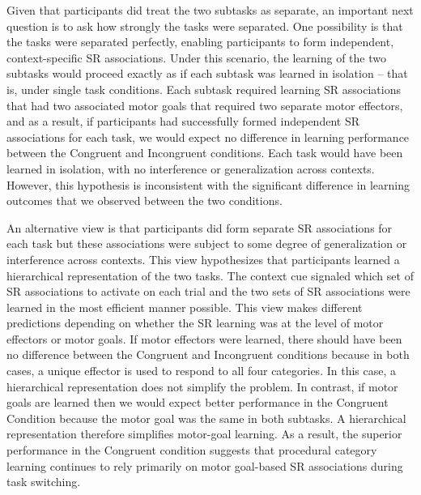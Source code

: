 \documentclass[doc, floatsintext]{apa7}
\begin{document}
Given that participants did treat the two subtasks as separate, an important next question is to ask how strongly the tasks were separated. One possibility is that the tasks were separated perfectly, enabling participants to form independent, context-specific SR associations. Under this scenario, the learning of the two subtasks would proceed exactly as if each subtask was learned in isolation -- that is, under single task conditions. Each subtask  required learning SR associations that had two associated motor goals that required two separate motor effectors, and as a result, if participants had successfully formed independent SR associations for each task, we would expect no difference in learning performance between the Congruent and Incongruent conditions. Each task would have been learned in isolation, with no interference or generalization across contexts. However, this hypothesis is inconsistent with the significant difference in learning outcomes that we observed between the two conditions.  

An alternative view is that participants did form separate SR associations for each task but these associations were subject to some degree of generalization or interference across contexts. This view hypothesizes that participants learned a hierarchical representation of the two tasks. The context cue signaled which set of SR associations to activate on each trial and the two sets of SR associations were learned in the most efficient manner possible. This view makes different predictions depending on whether the SR learning was at the level of motor effectors or motor goals. If motor effectors were learned, there should have been no difference between the Congruent and Incongruent conditions because in both cases, a unique effector is used to respond to all four categories. In this case, a hierarchical representation does not simplify the problem. In contrast, if motor goals are learned then we would expect better performance in the Congruent Condition because the motor goal was the same in both subtasks. A hierarchical representation therefore simplifies motor-goal learning. As a result, the superior performance in the Congruent condition suggests that procedural category learning continues to rely primarily on motor goal-based SR associations during task switching. 
\end{document}
